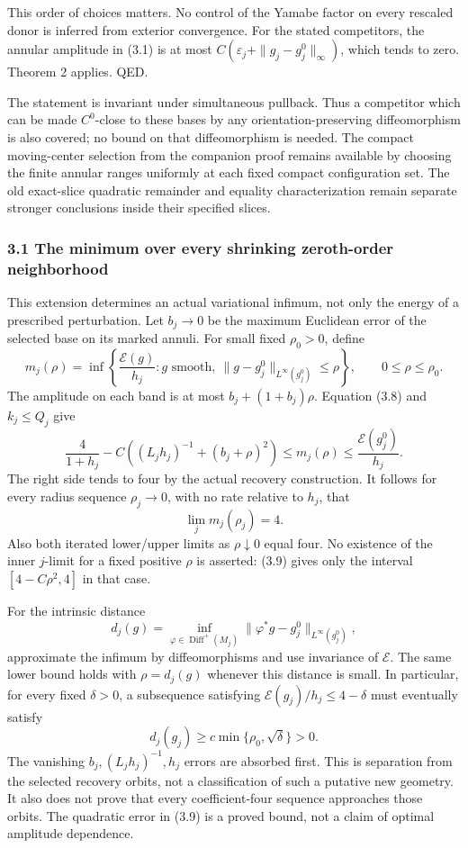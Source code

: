 \documentclass[
  11pt,
]{article}
\begin{document}
This order of choices matters. No control of the Yamabe factor on every
rescaled donor is inferred from exterior convergence. For the stated
competitors, the annular amplitude in (3.1) is at most
\(C(\varepsilon_j+\|g_j-g_j^0\|_\infty)\), which tends to zero. Theorem
2 applies. QED.

The statement is invariant under simultaneous pullback. Thus a
competitor which can be made \(C^0\)-close to these bases by any
orientation-preserving diffeomorphism is also covered; no bound on that
diffeomorphism is needed. The compact moving-center selection from the
companion proof remains available by choosing the finite annular ranges
uniformly at each fixed compact configuration set. The old exact-slice
quadratic remainder and equality characterization remain separate
stronger conclusions inside their specified slices.

\hypertarget{the-minimum-over-every-shrinking-zeroth-order-neighborhood}{%
\subsubsection{3.1 The minimum over every shrinking zeroth-order
neighborhood}\label{the-minimum-over-every-shrinking-zeroth-order-neighborhood}}

This extension determines an actual variational infimum, not only the
energy of a prescribed perturbation. Let \(b_j\to0\) be the maximum
Euclidean error of the selected base on its marked annuli. For small
fixed \(\rho_0>0\), define \[
 m_j(\rho)=\inf\left\{\frac{\mathcal E(g)}{h_j}:
       g\text{ smooth},\
       \|g-g_j^0\|_{L^\infty(g_j^0)}\le\rho\right\},
 \qquad 0\le\rho\le\rho_0 .
\] The amplitude on each band is at most \(b_j+(1+b_j)\rho\). Equation
(3.8) and \(k_j\le Q_j\) give \[
 \frac4{1+h_j}
   -C\left((L_jh_j)^{-1}+(b_j+\rho)^2\right)
 \le m_j(\rho)\le\frac{\mathcal E(g_j^0)}{h_j}.        \tag{3.9}
\] The right side tends to four by the actual recovery construction. It
follows for every radius sequence \(\rho_j\to0\), with no rate relative
to \(h_j\), that \[
                         \lim_j m_j(\rho_j)=4.        \tag{3.10}
\] Also both iterated lower/upper limits as \(\rho\downarrow0\) equal
four. No existence of the inner \(j\)-limit for a fixed positive
\(\rho\) is asserted: (3.9) gives only the interval \([4-C\rho^2,4]\) in
that case.

For the intrinsic distance \[
 d_j(g)=\inf_{\varphi\in\operatorname{Diff}^+(M_j)}
       \|\varphi^*g-g_j^0\|_{L^\infty(g_j^0)},
\] approximate the infimum by diffeomorphisms and use invariance of
\(\mathcal E\). The same lower bound holds with \(\rho=d_j(g)\) whenever
this distance is small. In particular, for every fixed \(\delta>0\), a
subsequence satisfying \(\mathcal E(g_j)/h_j\le4-\delta\) must
eventually satisfy \[
                    d_j(g_j)\ge c\min\{\rho_0,\sqrt\delta\}>0.
                                                               \tag{3.11}
\] The vanishing \(b_j,(L_jh_j)^{-1},h_j\) errors are absorbed first.
This is separation from the selected recovery orbits, not a
classification of such a putative new geometry. It also does not prove
that every coefficient-four sequence approaches those orbits. The
quadratic error in (3.9) is a proved bound, not a claim of optimal
amplitude dependence.
\end{document}
